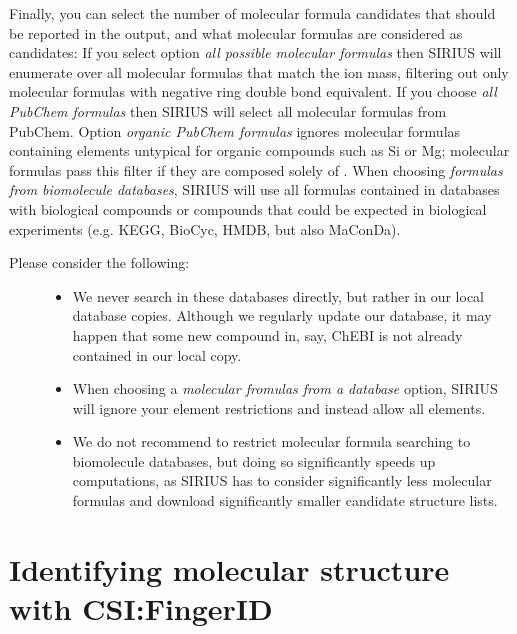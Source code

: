 \documentclass[letterpaper,10pt,openany,oneside]{sphinxmanual}
\newcommand\gui[1]{\textsl{\guilsinglleft#1\guilsinglright\xspace}}
\begin{document}
Finally, you can select the number of molecular formula candidates that
should be reported in the output, and what molecular formulas are considered
as candidates: If you select option \gui{all possible molecular
formulas} then SIRIUS will enumerate over all molecular formulas that
match the ion mass, filtering out only molecular formulas with negative ring
double bond equivalent. If you choose \gui{all PubChem formulas} then
SIRIUS will select all molecular formulas from PubChem.  Option
\gui{organic PubChem formulas} ignores molecular formulas containing
elements untypical for organic compounds such as Si or Mg; molecular formulas
pass this filter if they are composed solely of .  When
choosing \gui{formulas from biomolecule databases}, SIRIUS will use all
formulas contained in databases with biological compounds or compounds that
could be expected in biological experiments (e.g. KEGG, BioCyc, HMDB, but
also MaConDa).
%
\begin{description}
\item[{Please consider the following:}] \leavevmode\begin{itemize}
\item {} 
We never search in these databases directly, but rather in our local database
copies. Although we regularly update our database, it may happen that some
new compound in, say, ChEBI is not already contained in our local copy.

\item {} 
When choosing a \gui{molecular fromulas from a database} option, SIRIUS
will ignore your element restrictions and instead allow all elements.

\item {} 
We do not recommend to restrict molecular formula searching to biomolecule
databases, but doing so significantly speeds up computations, as SIRIUS has
to consider significantly less molecular formulas and download significantly
smaller candidate structure lists.
\end{itemize}
\end{description}



\section{Identifying molecular structure with CSI:FingerID}
\label{gui:identifying-molecular-structure-with-csi-fingerid}
\end{document}

